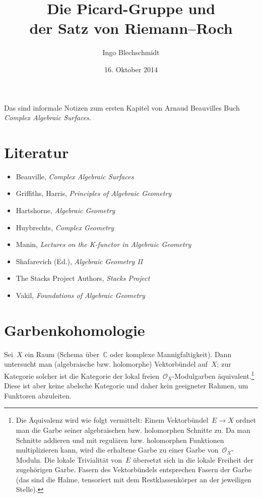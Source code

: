 \documentclass[a4paper,ngerman,12pt]{scrartcl}
\theoremstyle{definition}
\theoremstyle{plain}
\theoremstyle{remark}
\newcommand{\CC}{\mathbb{C}}
\renewcommand{\O}{\mathcal{O}}
\begin{document}
\title{Die Picard-Gruppe und \\ der Satz von Riemann--Roch}
\author{Ingo Blechschmidt}
\date{16. Oktober 2014}
\maketitle

\begin{center}\begin{minipage}{0.8\textwidth}
Das sind informale Notizen zum ersten Kapitel von Arnaud Beauvilles Buch
\emph{Complex Algebraic Surfaces}.
\end{minipage}\end{center}

\vspace{-3em}
\renewcommand\contentsname{}
\tableofcontents


\section*{Literatur}

\begin{itemize}
\item Beauville, \emph{Complex Algebraic Surfaces}
\item Griffiths, Harris, \emph{Principles of Algebraic Geometry}
\item Hartshorne, \emph{Algebraic Geometry}
\item Huybrechts, \emph{Complex Geometry}
\item Manin, \emph{Lectures on the K-functor in Algebraic Geometry}
\item Shafarevich (Ed.), \emph{Algebraic Geometry II}
\item The Stacks Project Authors, \emph{Stacks Project}
\item Vakil, \emph{Foundations of Algebraic Geometry}
\end{itemize}


\section{Garbenkohomologie}

Sei~$X$ ein Raum (Schema über~$\CC$ oder komplexe Mannigfaltigkeit). Dann
untersucht man (algebraische bzw. holomorphe) Vektorbündel auf~$X$; zur
Kategorie solcher ist die Kategorie der lokal freien~$\O_X$-Modulgarben äquivalent.\footnote{Die
Äquivalenz wird wie folgt vermittelt: Einem Vektorbündel~$E \to X$ ordnet man
die Garbe seiner algebraischen bzw. holomorphen Schnitte zu. Da man Schnitte
addieren und mit regulären bzw. holomorphen Funktionen multiplizieren kann,
wird die erhaltene Garbe zu einer Garbe von~$\O_X$-Moduln. Die lokale
Trivialität von~$E$ übersetzt sich in die lokale Freiheit der zugehörigen
Garbe. Fasern des Vektorbündels entsprechen Fasern der Garbe (das sind die
Halme, tensoriert mit dem Restklassenkörper an der jeweiligen Stelle).}
Diese ist aber keine abelsche Kategorie und daher kein geeigneter Rahmen, um
Funktoren abzuleiten.
\end{document}
